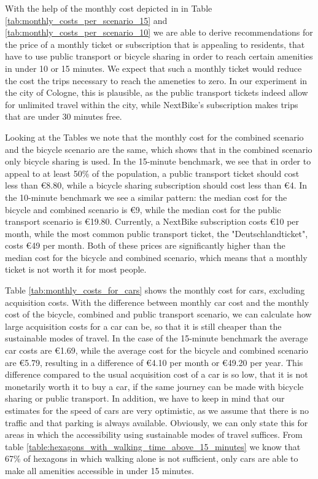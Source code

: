 With the help of the monthly cost depicted in in Table \ref{tab:monthly_costs_per_scenario_15} and \ref{tab:monthly_costs_per_scenario_10} we are able to derive recommendations for the price of a monthly ticket or subscription that is appealing to residents, that have to use public transport or bicycle sharing in order to reach certain amenities in under 10 or 15 minutes.
We expect that such a monthly ticket would reduce the cost the trips necessary to reach the ameneties to zero.
In our experiment in the city of Cologne, this is plausible, as the public transport tickets indeed allow for unlimited travel within the city, while NextBike's subscription makes trips that are under 30 minutes free.

Looking at the Tables we note that the monthly cost for the combined scenario and the bicycle scenario are the same, which shows that in the combined scenario only bicycle sharing is used.
In the 15-minute benchmark, we see that in order to appeal to at least 50\% of the population, a public transport ticket should cost less than \euro{8.80}, while a bicycle sharing subscription should cost less than \euro{4}.
In the 10-minute benchmark we see a similar pattern: the median cost for the bicycle and combined scenario is \euro{9}, while the median cost for the public transport scenario is \euro{19.80}.
Currently, a NextBike subscription costs \euro{10} per month, while the most common public transport ticket, the "Deutschlandticket", costs \euro{49} per month.
Both of these prices are significantly higher than the median cost for the bicycle and combined scenario, which means that a monthly ticket is not worth it for most people.

Table \ref{tab:monthly_costs_for_cars} shows the monthly cost for cars, excluding acquisition costs.
With the difference between monthly car cost and the monthly cost of the bicycle, combined and public transport scenario, we can calculate how large acquisition costs for a car can be, so that it is still cheaper than the sustainable modes of travel.
In the case of the 15-minute benchmark the average car costs are \euro{1.69}, while the average cost for the bicycle and combined scenario are \euro{5.79}, resulting in a difference of \euro{4.10} per month or \euro{49.20} per year.
This difference compared to the usual acquisition cost of a car is so low, that it is not monetarily worth it to buy a car, if the same journey can be made with bicycle sharing or public transport.
In addition, we have to keep in mind that our estimates for the speed of cars are very optimistic, as we assume that there is no traffic and that parking is always available.
Obviously, we can only state this for areas in which the accessibility using sustainable modes of travel suffices.
From table \ref{table:hexagons_with_walking_time_above_15_minutes} we know that 67\% of hexagons in which walking alone is not sufficient, only cars are able to make all amenities accessible in under 15 minutes.



